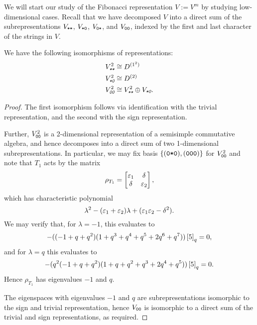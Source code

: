 \documentclass{amsart}
\begin{document}
We will start our study of the Fibonacci representation $V := V^m$ by studying low-dimensional cases.
Recall that we have decomposed $V$ into a direct sum of the subrepresentations $V_{\texttt{*}\texttt{*}}$, $V_{\texttt{*}\texttt{0}}$, $V_{\texttt{0}\texttt{*}}$, and $V_{\texttt{0}\texttt{0}}$, indexed by the first and last character of the strings in $V$.
\begin{proposition}\label{2 correspondence}
  We have the following isomorphisms of representations:
  \begin {align*}
    \emph{$V_{\texttt{*}\texttt{*}}^2$} &\cong D^{(1^2)}\\
    \emph{$V_{\texttt{*}\texttt{0}}^2$} &\cong D^{(2)}\\
    \emph{$V_{\texttt{0}\texttt{0}}^2$} &\cong \emph{$V_{\texttt{*}\texttt{*}}^2 \oplus V_{\texttt{*}\texttt{0}}$}.
  \end{align*}
\end{proposition}
\begin{proof}
  The first isomorphism follows via identification with the trivial representation, and the second with the sign representation.

  Further, $V_{\texttt{0}\texttt{0}}^2$ is a 2-dimensional representation of a semisimple commutative algebra, and hence decomposes into a direct sum of two 1-dimensional subrepresentations.
  In particular, we may fix basis $\left\{ (\texttt{0}\texttt{*}\texttt{0}),(\texttt{0}\texttt{0}\texttt{0}) \right\}$ for $V_{\texttt{0}\texttt{0}}^2$ and note that $T_1$ acts by the matrix
  \[
    \rho_{T_1} = \begin{bmatrix}
      \varepsilon_1 & \delta\\
      \delta & \varepsilon_2
    \end{bmatrix},
  \]
  which has characteristic polynomial \[\lambda^2 - (\varepsilon_1 + \varepsilon_2)\lambda +(\varepsilon_1\varepsilon_2 - \delta^2).\]
  We may verify that, for $\lambda = -1$, this evaluates to
  \[
    -((-1 + q + q^2) (1 + q^3 + q^4 + q^5 + 2 q^6 + q^7))\left[ 5 \right]_q = 0,
  \]
  and for $\lambda = q$ this evaluates to 
  \[
  -(q^2 (-1 + q + q^2) (1 + q + q^2 + q^3 + 2 q^4 + q^5)) \left[ 5 \right]_q = 0.
  \]
  Hence $\rho_{T_1}$ has eigenvalues $-1$ and $q$.

  The eigenspaces with eigenvalues $-1$ and $q$ are subrepresentations isomorphic to the sign and trivial representation, hence $V_{\texttt{0}\texttt{0}}$ is isomorphic to a direct sum of the trivial and sign representations, as required.
\end{proof}
\end{document}
